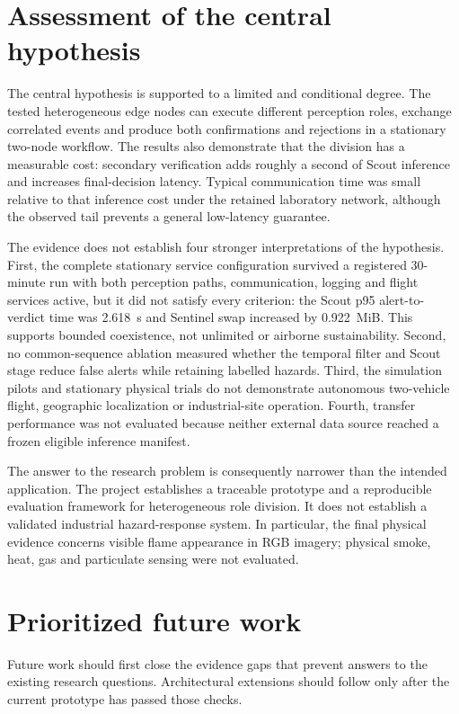 \section{Assessment of the central hypothesis}
\label{sec:conclusion:2}

The central hypothesis is supported to a limited and conditional degree. The
tested heterogeneous edge nodes can execute different perception roles, exchange
correlated events and produce both confirmations and rejections in a stationary
two-node workflow. The results also demonstrate that the division has a
measurable cost: secondary verification adds roughly a second of Scout
inference and increases final-decision latency. Typical communication time was
small relative to that inference cost under the retained laboratory network,
although the observed tail prevents a general low-latency guarantee.

The evidence does not establish four stronger interpretations of the
hypothesis. First, the complete stationary service configuration survived a
registered 30-minute run with both perception paths, communication, logging and
flight services active, but it did not satisfy every criterion: the Scout p95
alert-to-verdict time was 2.618~s and Sentinel swap increased by 0.922~MiB.
This supports bounded coexistence, not unlimited or airborne sustainability.
Second, no
common-sequence ablation measured whether the temporal filter and Scout stage
reduce false alerts while retaining labelled hazards. Third, the simulation
pilots and stationary physical trials do not demonstrate autonomous
two-vehicle flight, geographic localization or industrial-site operation.
Fourth, transfer performance was not evaluated because neither external data
source reached a frozen eligible inference manifest.

The answer to the research problem is consequently narrower than the intended
application. The project establishes a traceable prototype and a reproducible
evaluation framework for heterogeneous role division. It does not establish a
validated industrial hazard-response system. In particular, the final physical
evidence concerns visible flame appearance in RGB imagery; physical smoke,
heat, gas and particulate sensing were not evaluated.

\section{Prioritized future work}
\label{sec:conclusion:3}

Future work should first close the evidence gaps that prevent answers to the
existing research questions. Architectural extensions should follow only after
the current prototype has passed those checks.

